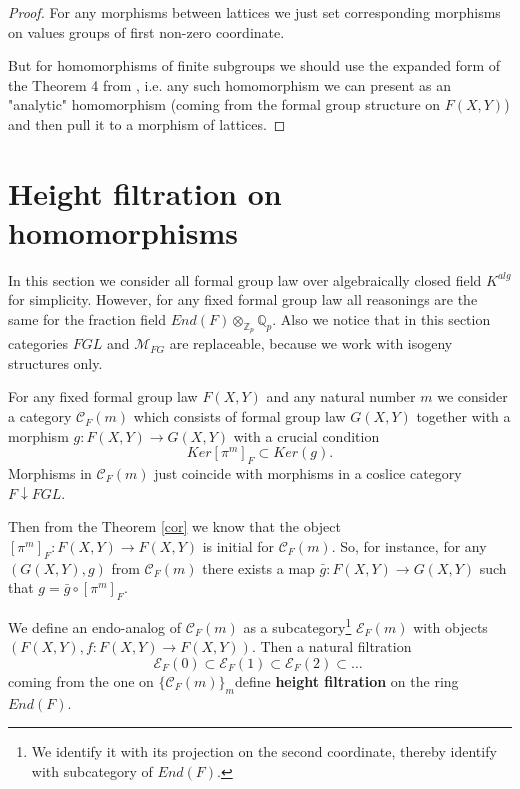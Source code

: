 \documentclass[
11pt,%
tightenlines,%
twoside,%
onecolumn,%
nofloats,%
nobibnotes,%
nofootinbib,%
superscriptaddress,%
noshowpacs,%
centertags]%
{revtex4}
\begin{document}
\begin{proof}
For any morphisms between lattices we just set corresponding morphisms on values groups of first non-zero coordinate.

But for homomorphisms of finite subgroups we should use the expanded form of the Theorem 4 from \cite{Tate}, i.e. any such homomorphism we can present as an "analytic" homomorphism (coming from the formal group structure on $F(X,Y)$) and then pull it to a morphism of lattices.
\end{proof}

\section{Height filtration on homomorphisms}
\label{filt}
In this section we consider all formal group law over algebraically closed field $K^{alg}$ for simplicity. However, for any fixed formal group law all reasonings are the same for the fraction field $End(F)\otimes_{\mathbb{Z}_{p}}\mathbb{Q}_{p}$. Also we notice that in this section categories $FGL$ and $\mathcal{M}_{FG}$ are replaceable, because we work with isogeny structures only.

For any fixed formal group law $F(X,Y)$ and any natural number $m$ we consider a category $\mathcal{C}_{F}(m)$ which consists of formal group law $G(X,Y)$ together with a morphism $g:F(X,Y) \rightarrow G(X,Y)$ with a crucial condition
$$Ker [\pi^{m}]_{F} \subset Ker (g).$$
Morphisms in $\mathcal{C}_{F}(m)$ just coincide with morphisms in a coslice category $F \downarrow FGL$.

Then from the Theorem \ref{cor} we know that the object $[\pi^{m}]_{F}: F(X,Y) \rightarrow F(X,Y)$ is initial for $\mathcal{C}_{F}(m)$. So, for instance, for any $(G(X,Y), g)$ from $\mathcal{C}_{F}(m)$ there exists a map $\bar{g}: F(X,Y) \rightarrow G(X,Y)$ such that $g = \bar{g}\circ [\pi^{m}]_{F}$.

\begin{definition}\label{heightfiltration}
We define an endo-analog of $\mathcal{C}_{F}(m)$ as a subcategory\footnote{We identify it with its projection on the second coordinate, thereby identify with subcategory of $End(F)$.} $\mathcal{E}_{F}(m)$ with objects $\left(F(X,Y), f:F(X,Y)\rightarrow F(X,Y)\right)$. Then a natural filtration
$$\mathcal{E}_{F}(0) \subset \mathcal{E}_{F}(1) \subset \mathcal{E}_{F}(2) \subset \dots \;$$
coming from the one on $\{\mathcal{C}_{F}(m)\}_{m}$define \textbf{height filtration} on the ring $End(F)$.
\end{definition}
\end{document}
